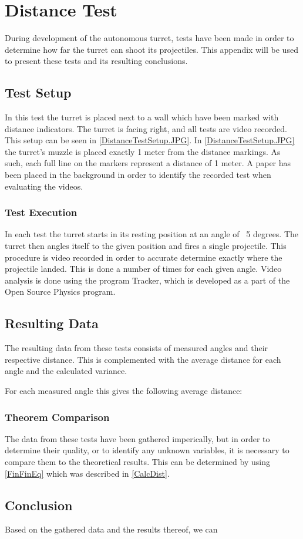 \chapter{Distance Test}
During development of the autonomous turret, tests have been made in order to
determine how far the turret can shoot its projectiles. This appendix will be
used to present these tests and its resulting conclusions.

\section{Test Setup}
In this test the turret is placed next to a wall which have been marked with
distance indicators. The turret is facing right, and all tests are video
recorded. This setup can be seen in \autoref{DistanceTestSetup.JPG}.
 In \autoref{DistanceTestSetup.JPG} the turret's muzzle is placed exactly 1 meter
from the distance markings. As such, each full line on the markers represent a
distance of 1 meter. A paper has been placed in the background in order to
identify the recorded test when evaluating the videos. 

\subsection{Test Execution}
In each test the turret starts in its resting position at an angle of ~5
degrees. The turret then angles itself to the given position and fires a single
projectile. This procedure is video recorded in order to accurate determine
exactly where the projectile landed. This is done a number of times for each
given angle. Video analysis is done using the program Tracker, which is
developed as a part of the Open Source Physics program.

\section{Resulting Data}
The resulting data from these tests consists of measured angles and their
respective distance. This is complemented with the average distance for each
angle and the calculated variance.

For each measured angle this gives the following average distance:

\subsection{Theorem Comparison}
The data from these tests have been gathered imperically, but in order to
determine their quality, or to identify any unknown variables, it is necessary
to compare them to the theoretical results. This can be determined by using
\autoref{FinFinEq} which was described in \autoref{CalcDist}.

\section{Conclusion}
Based on the gathered data and the results thereof, we can 
